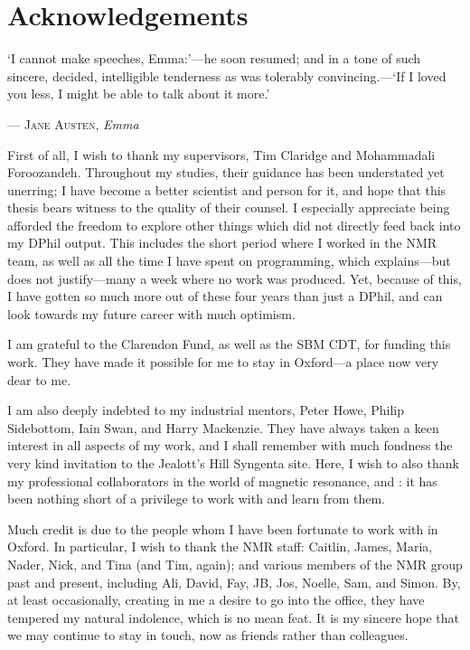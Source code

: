 \chapter{Acknowledgements}

\epigraph{\singlespacing%
`I cannot make speeches, Emma:'---he soon resumed; and in a tone of such sincere, decided, intelligible tenderness as was tolerably convincing.---`If I loved you less, I might be able to talk about it more.'
}{--- \textsc{Jane Austen}, \textit{Emma}}


First of all, I wish to thank my supervisors, Tim Claridge and Mohammadali Foroozandeh.
Throughout my studies, their guidance has been understated yet unerring; I have become a better scientist and person for it, and hope that this thesis bears witness to the quality of their counsel.
I especially appreciate being afforded the freedom to explore other things which did not directly feed back into my DPhil output.
This includes the short period where I worked in the NMR team, as well as all the time I have spent on programming, which explains---but does not justify---many a week where no work was produced.
Yet, because of this, I have gotten so much more out of these four years than just a DPhil, and can look towards my future career with much optimism.

I am grateful to the Clarendon Fund, as well as the SBM CDT, for funding this work.
They have made it possible for me to stay in Oxford---a place now very dear to me.

I am also deeply indebted to my industrial mentors, Peter Howe, Philip Sidebottom, Iain Swan, and Harry Mackenzie.
They have always taken a keen interest in all aspects of my work, and I shall remember with much fondness the very kind invitation to the Jealott's Hill Syngenta site.
Here, I wish to also thank my professional collaborators in the world of magnetic resonance, \EK{} and \JND{}: it has been nothing short of a privilege to work with and learn from them.

Much credit is due to the people whom I have been fortunate to work with in Oxford.
In particular, I wish to thank the NMR staff: Caitlin, James, Maria, Nader, Nick, and Tina (and Tim, again); and various members of the NMR group past and present, including Ali, David, Fay, JB, Jos, Noelle, Sam, and Simon.
By, at least occasionally, creating in me a desire to go into the office, they have tempered my natural indolence, which is no mean feat.
It is my sincere hope that we may continue to stay in touch, now as friends rather than colleagues.

